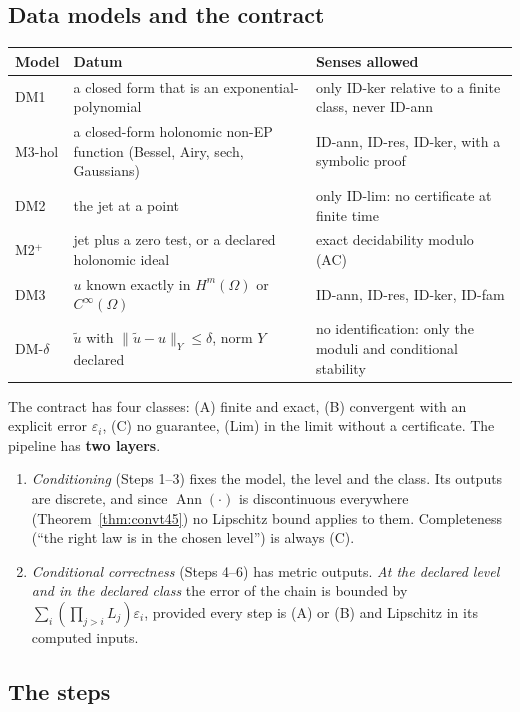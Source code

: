 \documentclass[11pt]{article}
\theoremstyle{plain}
\theoremstyle{definition}
\theoremstyle{remark}
\DeclareMathOperator{\Ann}{Ann}             %
\begin{document}
\subsection{Data models and the contract}

\begin{center}\small
\begin{tabular}{@{}L{1.9cm}L{4.8cm}L{7.7cm}@{}}
\toprule
Model & Datum & Senses allowed\\\midrule
DM1 & a closed form that is an exponential-polynomial & only ID-ker relative to a finite class, never ID-ann\\
M3-hol & a closed-form holonomic non-EP function (Bessel, Airy, sech, Gaussians) & ID-ann, ID-res, ID-ker, with a symbolic proof\\
DM2 & the jet at a point & only ID-lim: no certificate at finite time\\
M2$^+$ & jet plus a zero test, or a declared holonomic ideal & exact decidability modulo (AC)\\
DM3 & $u$ known exactly in $H^m(\Omega)$ or $C^\infty(\Omega)$ & ID-ann, ID-res, ID-ker, ID-fam\\
DM-$\delta$ & $\tilde u$ with $\|\tilde u-u\|_Y\le\delta$, norm $Y$ declared & no identification: only the moduli and conditional stability\\\bottomrule
\end{tabular}
\end{center}

The contract has four classes: (A) finite and exact, (B) convergent with an explicit error $\varepsilon_i$, (C) no guarantee, (Lim) in the limit without a certificate. The pipeline has \textbf{two layers}.

\begin{enumerate}
\item \emph{Conditioning} (Steps 1--3) fixes the model, the level and the class. Its outputs are discrete, and since $\Ann(\cdot)$ is discontinuous everywhere (Theorem~\ref{thm:convt45}) no Lipschitz bound applies to them. Completeness (``the right law is in the chosen level'') is always (C).
\item \emph{Conditional correctness} (Steps 4--6) has metric outputs. \emph{At the declared level and in the declared class} the error of the chain is bounded by $\sum_i(\prod_{j>i}L_j)\varepsilon_i$, provided every step is (A) or (B) and Lipschitz in its computed inputs.
\end{enumerate}

\subsection{The steps}
\end{document}
